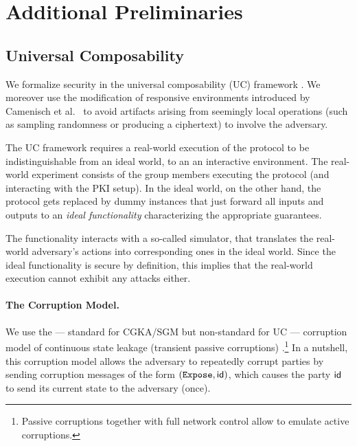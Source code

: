 \section{Additional Preliminaries} \label{sec:addPrelim}

\subsection{Universal Composability}\label{sec:uc}
We formalize security in the universal composability (UC) framework \cite{FOCS:Canetti01}. We moreover use the modification of responsive environments introduced by Camenisch et
al.~\cite{AC:CEKKR16} to avoid artifacts arising from seemingly local operations (such as sampling randomness or
producing a ciphertext) to involve the adversary.

The UC framework requires a real-world execution of the protocol to be indistinguishable from an ideal world, to an an interactive environment.
%
The real-world experiment consists of the group members executing the protocol (and interacting with the PKI setup).
In the ideal world, on the other hand, the protocol gets replaced by dummy instances that just forward all inputs and outputs to
an \emph{ideal functionality} characterizing the appropriate guarantees.

The functionality interacts with a so-called simulator, that translates the real-world adversary's actions into corresponding ones in the ideal world. Since the ideal functionality is secure by definition, this implies that the real-world execution cannot exhibit any attacks either.


\paragraph{The Corruption Model.}
We use the --- standard for CGKA/SGM but non-standard for UC --- corruption model of continuous state leakage (transient passive corruptions) \cite{TCC:ACJM20}.\footnote{Passive
  corruptions together with full network control allow to emulate active corruptions.}
%
In a nutshell, this corruption model allows the adversary to
repeatedly corrupt parties by sending corruption messages of the form $({\normalfont\texttt{Expose}}, {\mathsf{id}})$, which causes the party ${\mathsf{id}}$ to send its current state to the adversary (once).

